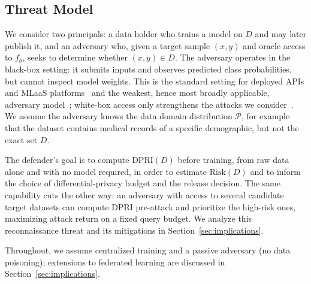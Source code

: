 \subsection{Threat Model}
\label{sec:threat}

We consider two principals: a data holder who trains a model on $D$ and
may later publish it, and an adversary who, given a target sample
$(x,y)$ and oracle access to $f_\theta$, seeks to determine whether
$(x,y) \in D$. The adversary operates in the black-box setting: it
submits inputs and observes predicted class probabilities, but cannot
inspect model weights. This is the standard setting for deployed APIs
and MLaaS platforms~\cite{shokri2017membership,truex2019demystifying}
and the weakest, hence most broadly applicable, adversary
model~\cite{salem2019ml}; white-box access only strengthens the attacks
we consider~\cite{nasr2019comprehensive,leino2020stolen}. We assume the
adversary knows the data domain distribution $\mathcal{P}$, for example
that the dataset contains medical records of a specific demographic, but
not the exact set $D$.

The defender's goal is to compute $\mathrm{DPRI}(D)$ before training,
from raw data alone and with no model required, in order to estimate
$\mathrm{Risk}(D)$ and to inform the choice of differential-privacy
budget and the release decision. The same capability cuts the other way:
an adversary with access to several candidate target datasets can
compute DPRI pre-attack and prioritize the high-risk ones, maximizing
attack return on a fixed query budget. We analyze this reconnaissance
threat and its mitigations in Section~\ref{sec:implications}.

Throughout, we assume centralized training and a passive adversary (no
data poisoning); extensions to federated learning are discussed in
Section~\ref{sec:implications}.

